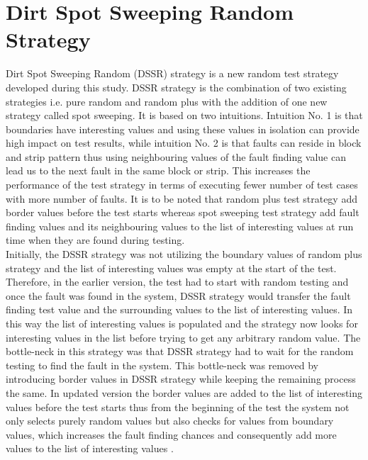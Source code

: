 

\section{Dirt Spot Sweeping Random Strategy}

Dirt Spot Sweeping Random (DSSR) strategy is a new random test strategy developed during this study. DSSR strategy is the combination of two existing strategies i.e. pure random and random plus with the addition of one new strategy called spot sweeping. It is based on two intuitions. Intuition No. 1 is that boundaries have interesting values and using these values in isolation can provide high impact on test results, while intuition No. 2 is that faults can reside in block and strip pattern thus using neighbouring values of the fault finding value can lead us to the next fault in the same block or strip. This increases the performance of the test strategy in terms of executing fewer number of test cases with more number of faults. It is to be noted that random plus test strategy add border values before the test starts whereas spot sweeping test strategy add fault finding values and its neighbouring values to the list of interesting values at run time when they are found during testing.\\

Initially, the DSSR strategy was not utilizing the boundary values of random plus strategy and the list of interesting values was empty at the start of the test. Therefore, in the earlier version, the test had to start with random testing and once the fault was found in the system, DSSR strategy would transfer the fault finding test value and the surrounding values to the list of interesting values. In this way the list of interesting values is populated and the strategy now looks for interesting values in the list before trying to get any arbitrary random value. The bottle-neck in this strategy was that DSSR strategy had to wait for the random testing to find the fault in the system. This bottle-neck was removed by introducing border values in DSSR strategy while keeping the remaining process the same. In updated version the border values are added to the list of interesting values before the test starts thus from the beginning of the test the system not only selects purely random values but also checks for values from boundary values, which increases the fault finding chances and consequently add more values to the list of interesting values \cite{Kaner2004}.\\

